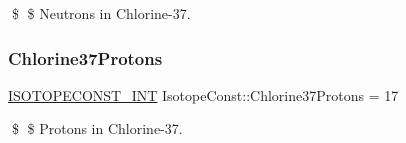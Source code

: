 \$ \$ Neutrons in Chlorine-\/37. \mbox{\label{group___isotope_const-_chlorine-_cl37_ga46cdcb6eac64fffafc2d156667f805dd}} 
\subsubsection{\texorpdfstring{Chlorine37\+Protons}{Chlorine37Protons}}
{\footnotesize\ttfamily \mbox{\hyperlink{group___isotope_const-_macros_ga5f18360b3e99483a35c32d789e62621c}{I\+S\+O\+T\+O\+P\+E\+C\+O\+N\+S\+T\+\_\+\+I\+NT}} Isotope\+Const\+::\+Chlorine37\+Protons = 17}

\$ \$ Protons in Chlorine-\/37. 